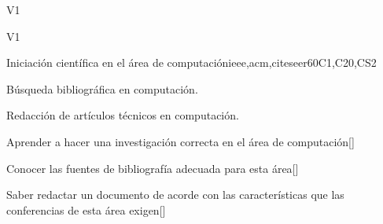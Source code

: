 \begin{syllabus}
\begin{outcomes}{V1}
  \item {}
  \item {}
  \item {}
  \item {}
  \item {}
  \item {}
  \item {}
  \item {}
\end{outcomes}
\begin{competences}{V1}
    \item {} 
    \item {}
    \item {}
\end{competences}

\begin{unit}{Iniciación científica en el área de computación}{}{ieee,acm,citeseer}{60}{C1,C20,CS2}
  \begin{topics}
      \item Búsqueda bibliográfica en computación.
      \item Redacción de artículos técnicos en computación.
  \end{topics}
  \begin{learningoutcomes}
      \item Aprender a hacer una investigación correcta en el área de computación[\Usage]
      \item Conocer las fuentes de bibliografía adecuada para esta área[\Usage]
      \item Saber redactar un documento de acorde con las características que las conferencias de esta área exigen[\Usage]
  \end{learningoutcomes}
\end{unit}

\begin{coursebibliography}
\end{coursebibliography}

\end{syllabus}
